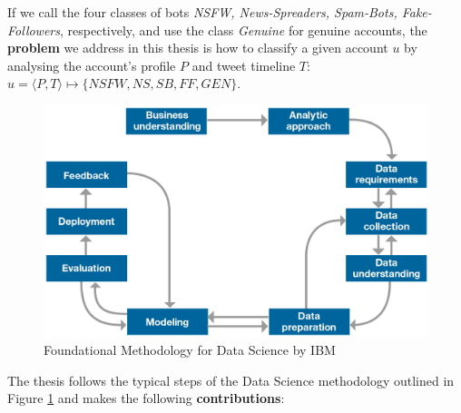 If we call the four classes of bots \emph{NSFW, News-Spreaders, Spam-Bots, Fake-Followers}, respectively, 
and use the class \emph{Genuine} for genuine accounts, the \textbf{problem} we address in this thesis is how to classify a given account $u$ by analysing the account's profile $P$ and tweet timeline $T$:  
$u = \langle P, T \rangle \mapsto \{NSFW, NS, SB, FF, GEN\}$.


\begin{figure}
	\includegraphics[width=\linewidth]{chapter1/figure/methodology.jpg}
	\caption{Foundational Methodology for Data Science by IBM}
	\label{fig:methodology}
\end{figure}

The thesis follows the typical steps of the Data Science methodology outlined in Figure \ref{fig:methodology} and makes the following \textbf{contributions}:


